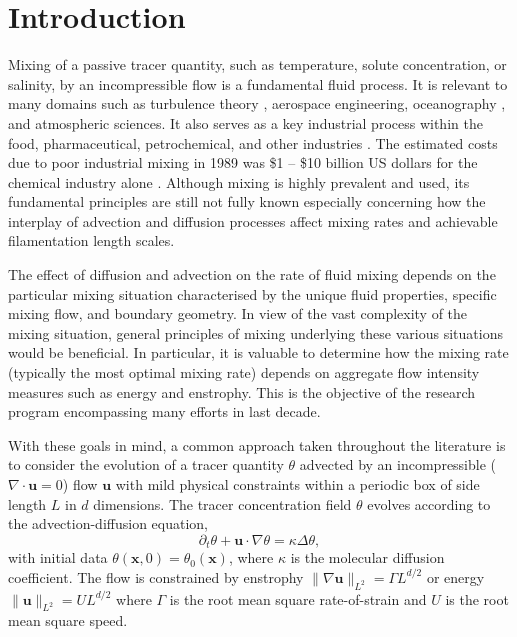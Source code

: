 \documentclass[12pt]{iopart}
\newcommand{\ltwo}[1]{\|#1\|_{L^{2}}}
\renewcommand{\vec}[1]{\mathbf{#1}}
\renewcommand{\u}{\mathbf{u}}
\newcommand{\ppt}[1]{\partial_{t} #1}
\newcommand{\lap}{\Delta }
\begin{document}
\submitto{\NL}
%
% 
%

\section{Introduction}
\label{sec:introduction}

Mixing of a passive tracer quantity, such as temperature, solute concentration, or salinity, by an incompressible flow is a fundamental fluid process. It is relevant to many domains such as turbulence theory \cite{Dimotakis2005,Violeau2000a}, aerospace engineering, oceanography \cite{Wunsch2004}, and atmospheric sciences. It also serves as a key industrial process within the food, pharmaceutical, petrochemical, and other industries \cite{paul2004handbook}. The estimated costs due to poor industrial mixing in 1989 was \$1 -- \$10 billion US dollars for the chemical industry alone \cite{paul2004handbook}. Although mixing is highly prevalent and used, its fundamental principles are still not fully known especially concerning how the interplay of advection and diffusion processes affect mixing rates and achievable filamentation length scales.

The effect of diffusion and advection on the rate of fluid mixing depends on the particular mixing situation characterised by the unique fluid properties, specific mixing flow, and boundary geometry. In view of the vast complexity of the mixing situation, general principles of mixing underlying these various situations would be beneficial. In particular, it is valuable to determine how the mixing rate (typically the most optimal mixing rate) depends on aggregate flow intensity measures such as energy and enstrophy. This is the objective of the research program encompassing many efforts \cite{CS2013,GI2014,JLT2012,JFM2011, Miles2017a,  JLT2012, DF2014, GM2005} in last decade. 

With these goals in mind, a common approach taken throughout the literature is to consider the evolution of a tracer quantity $\theta$ advected by an incompressible ($\nabla \cdot\vec{u}=0$) flow $\vec{u}$ with mild physical constraints within a periodic box  of side length $L$ in $d$ dimensions. The tracer concentration field $\theta$ evolves according to the advection-diffusion equation,
\begin{equation}
	\label{eq:PDE_advection}
	\ppt{\theta}+\mathbf{u}\cdot \nabla \theta=\kappa \lap\theta,
\end{equation}
with initial data $\theta(\mathbf{x},0)=\theta_{0}(\mathbf{x})$, where $\kappa$ is the molecular diffusion coefficient. The flow is constrained by enstrophy $\ltwo{\nabla\u} = \Gamma L^{d/2}$ or energy $\ltwo{\u} = UL^{d/2}$ where $\Gamma$ is the root mean square rate-of-strain and $U$ is the root mean square speed. 
\end{document}
